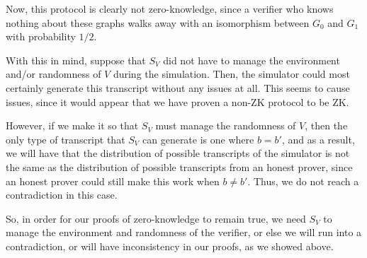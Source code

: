 \documentclass[11pt]{article}
\begin{document}
Now, this protocol is clearly not zero-knowledge, since a verifier who knows nothing about these graphs walks away with an isomorphism between \(G_0\) and \(G_1\) with probability \(1/2\). \bigskip

With this in mind, suppose that \(S_V\) did not have to manage the environment and/or randomness of \(V\) during the simulation. Then, the simulator could most certainly generate this transcript without any issues at all. This seems to cause issues, since it would appear that we have proven a non-ZK protocol to be ZK.\bigskip

However, if we make it so that \(S_V\) must manage the randomness of \(V\), then the only type of transcript that \(S_V\) can generate is one where \(b=b'\), and as a result, we will have that the distribution of possible transcripts of the simulator is not the same as the distribution of possible transcripts from an honest prover, since an honest prover could still make this work when \(b\ne b'\). Thus, we do not reach a contradiction in this case.\medskip

So, in order for our proofs of zero-knowledge to remain true, we need \(S_V\) to manage the environment and randomness of the verifier, or else we will run into a contradiction, or will have inconsistency in our proofs, as we showed above.
\end{document}

